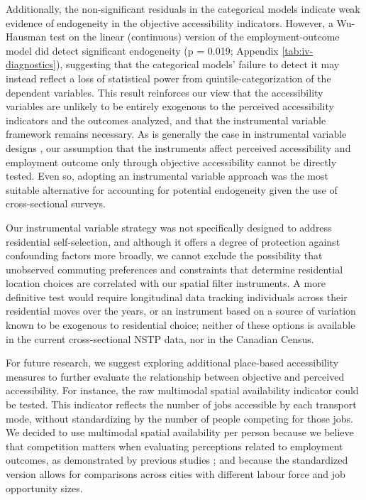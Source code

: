 \documentclass[preprint, 3p,
authoryear]{elsarticle} %
\begin{document}
Additionally, the non-significant residuals in the categorical models
indicate weak evidence of endogeneity in the objective accessibility
indicators. However, a Wu-Hausman test on the linear (continuous)
version of the employment-outcome model did detect significant
endogeneity (p = 0.019; Appendix \ref{tab:iv-diagnostics}), suggesting
that the categorical models' failure to detect it may instead reflect a
loss of statistical power from quintile-categorization of the dependent
variables. This result reinforces our view that the accessibility
variables are unlikely to be entirely exogenous to the perceived
accessibility indicators and the outcomes analyzed, and that the
instrumental variable framework remains necessary. As is generally the
case in instrumental variable designs
\citep{cunningham2021causal, huntington-klein2021}, our assumption that
the instruments affect perceived accessibility and employment outcome
only through objective accessibility cannot be directly tested. Even so,
adopting an instrumental variable approach was the most suitable
alternative for accounting for potential endogeneity given the use of
cross-sectional surveys.

Our instrumental variable strategy was not specifically designed to
address residential self-selection, and although it offers a degree of
protection against confounding factors more broadly, we cannot exclude
the possibility that unobserved commuting preferences and constraints
that determine residential location choices are correlated with our
spatial filter instruments. A more definitive test would require
longitudinal data tracking individuals across their residential moves
over the years, or an instrument based on a source of variation known to
be exogenous to residential choice; neither of these options is
available in the current cross-sectional NSTP data, nor in the Canadian
Census.

For future research, we suggest exploring additional place-based
accessibility measures to further evaluate the relationship between
objective and perceived accessibility. For instance, the raw multimodal
spatial availability indicator could be tested. This indicator reflects
the number of jobs accessible by each transport mode, without
standardizing by the number of people competing for those jobs. We
decided to use multimodal spatial availability per person because we
believe that competition matters when evaluating perceptions related to
employment outcomes, as demonstrated by previous studies
\citep{jin2018, merlin2017, miller2005}; and because the standardized
version allows for comparisons across cities with different labour force
and job opportunity sizes.
\end{document}
